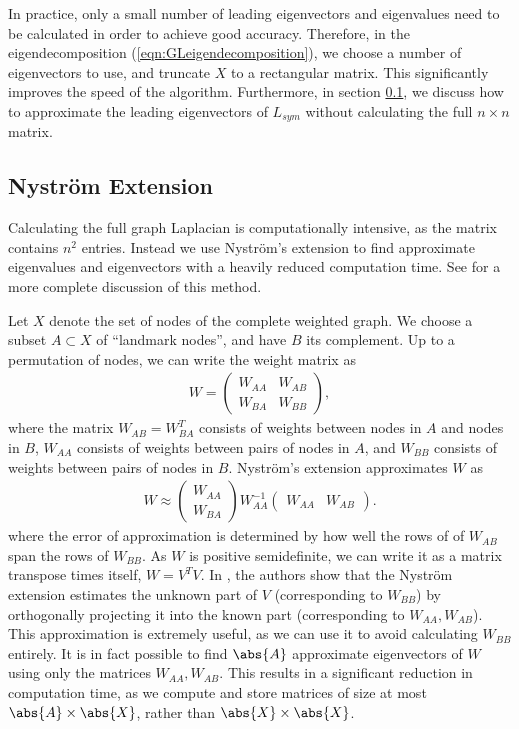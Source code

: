\documentclass[journal]{IEEEtran}
\begin{document}
In practice, only a small number of leading eigenvectors and eigenvalues need to
be calculated in order to achieve good accuracy. Therefore, in the
eigendecomposition (\ref{eqn:GLeigendecomposition}), we choose a number of
eigenvectors to use, and truncate $X$ to a rectangular matrix. This
significantly improves the speed of the algorithm. Furthermore, in section
\ref{sec:Nystrom}, we discuss how to approximate the leading eigenvectors of
$L_{sym}$ without calculating the full $n \times n$ matrix.

\subsection{Nystr\"{o}m Extension}\label{sec:Nystrom}
Calculating the full graph Laplacian is computationally intensive, as the matrix
contains $n^2$ entries. Instead we use Nystr\"{o}m's extension to find
approximate eigenvalues and eigenvectors with a heavily reduced computation
time. See \cite{Fowlkes04, Merkurjev13, Woodworth13} for a more complete
discussion of this method.

Let $X$ denote the set of nodes of the complete weighted graph. We choose a
subset $A\subset X$ of ``landmark nodes'', and have $B$ its complement. Up to a
permutation of nodes, we can write the weight matrix as
\begin{align}
  W = \begin{pmatrix} W_{AA} & W_{AB} \\ W_{BA} & W_{BB}
  \end{pmatrix},
\end{align}
where the matrix $W_{AB} = W_{BA}^T$ consists of weights between nodes in $A$
and nodes in $B$, $W_{AA}$ consists of weights between pairs of nodes in $A$,
and $W_{BB}$ consists of weights between pairs of nodes in $B$. Nystr\"{o}m's
extension approximates $W$ as
\begin{align}
  W \approx \begin{pmatrix} W_{AA} \\ W_{BA} \end{pmatrix}
  W_{AA}^{-1} \begin{pmatrix} W_{AA} & W_{AB}\end{pmatrix}.
\end{align}
where the error of approximation is determined by how well the rows of of
$W_{AB}$ span the rows of $W_{BB}$. As $W$ is positive semidefinite, we can
write it as a matrix transpose times itself, $W = V^TV$. In \cite{Belongie2002},
the authors show that the Nystr\"{o}m extension estimates the unknown part of
$V$ (corresponding to $W_{BB}$) by orthogonally projecting it into the known
part (corresponding to $W_{AA},W_{AB}$).  This approximation is extremely
useful, as we can use it to avoid calculating $W_{BB}$ entirely. It is in fact
possible to find $\abs{A}$ approximate eigenvectors of $W$ using only the
matrices $W_{AA},W_{AB}$. This results in a significant reduction in computation
time, as we compute and store matrices of size at most $\abs{A}\times\abs{X}$,
rather than $\abs{X}\times\abs{X}$.
\end{document}
